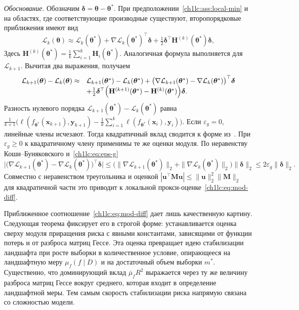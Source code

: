 \label{ch1lc:app:proof-mod-diff}
\noindent\textit{Обоснование.} Обозначим $\boldsymbol{\delta}=\boldsymbol{\theta}-\boldsymbol{\theta}^*$.
При предположении~\ref{ch1lc:ass:local-min} и на областях, где соответствующие производные существуют, второпорядковые приближения имеют вид
\[
  \mathcal{L}_k(\boldsymbol{\theta})
  \approx \mathcal{L}_k(\boldsymbol{\theta}^*)
  + \nabla\mathcal{L}_k(\boldsymbol{\theta}^*)^\top\boldsymbol{\delta}
  + \tfrac{1}{2}\boldsymbol{\delta}^\top \mathbf{H}^{(k)}(\boldsymbol{\theta}^*)\boldsymbol{\delta},
\]
Здесь $\mathbf{H}^{(k)}(\boldsymbol{\theta}^*)=\frac{1}{k}\sum_{i=1}^k \mathbf{H}_i(\boldsymbol{\theta}^*)$. Аналогичная формула выполняется для $\mathcal{L}_{k+1}$. Вычитая два выражения, получаем
\[
\begin{array}{rl}
  \mathcal{L}_{k+1}(\boldsymbol{\theta}) - \mathcal{L}_k(\boldsymbol{\theta})
  \approx & \mathcal{L}_{k+1}(\boldsymbol{\theta}^*) - \mathcal{L}_k(\boldsymbol{\theta}^*)
  + \bigl(\nabla\mathcal{L}_{k+1}(\boldsymbol{\theta}^*) - \nabla\mathcal{L}_k(\boldsymbol{\theta}^*)\bigr)^\top\boldsymbol{\delta}
  \\
  & + \tfrac{1}{2}\boldsymbol{\delta}^\top
  \Bigl(\mathbf{H}^{(k+1)}(\boldsymbol{\theta}^*) - \mathbf{H}^{(k)}(\boldsymbol{\theta}^*)\Bigr)\boldsymbol{\delta}.
\end{array}
\]
Разность нулевого порядка $\mathcal{L}_{k+1}(\boldsymbol{\theta}^*) - \mathcal{L}_k(\boldsymbol{\theta}^*)$ равна
$\frac{1}{k+1}\bigl(\ell(f_{\boldsymbol{\theta}^*}(\mathbf{x}_{k+1}),\mathbf{y}_{k+1}) - \frac{1}{k}\sum_{i=1}^{k}\ell(f_{\boldsymbol{\theta}^*}(\mathbf{x}_{i}),\mathbf{y}_{i})\bigr)$.
Если $\varepsilon_g=0$, линейные члены исчезают. Тогда квадратичный вклад сводится к форме из~\cite{grabovoi2024unraveling748584228}. При $\varepsilon_g\ge 0$ к квадратичному члену применимы те же оценки модуля.
По неравенству Коши--Буняковского и~\eqref{ch1lc:eq:eps-g}
\[
  \bigl|\bigl(\nabla\mathcal{L}_{k+1}(\boldsymbol{\theta}^*) - \nabla\mathcal{L}_k(\boldsymbol{\theta}^*)\bigr)^\top\boldsymbol{\delta}\bigr|
  \le \bigl(\|\nabla\mathcal{L}_{k+1}(\boldsymbol{\theta}^*)\|_2 + \|\nabla\mathcal{L}_k(\boldsymbol{\theta}^*)\|_2\bigr)\|\boldsymbol{\delta}\|_2
  \le 2\varepsilon_g\|\boldsymbol{\delta}\|_2 .
\]
Совместно с неравенством треугольника и оценкой $|\mathbf{u}^\top \mathbf{M}\mathbf{u}|\le \|\mathbf{u}\|_2^2\|\mathbf{M}\|_2$ для квадратичной части это приводит к локальной прокси-оценке~\eqref{ch1lc:eq:mod-diff}.

Приближенное соотношение~\eqref{ch1lc:eq:mod-diff} дает лишь качественную картину.
Следующая теорема фиксирует его в строгой форме: устанавливается оценка сверху модуля приращения риска с явными константами, зависящими от функции потерь и от разброса матриц Гессе.
Эта оценка превращает идею стабилизации ландшафта при росте выборки в количественное условие, опирающееся на ландшафтную меру $\mu_f(f\mid D)$ и на достаточный объем выборки $m^*$.
Существенно, что доминирующий вклад $\bar\mu_f R^2$ выражается через ту же величину разброса матриц Гессе вокруг среднего, которая входит в определение ландшафтной меры.
Тем самым скорость стабилизации риска напрямую связана со сложностью модели.

